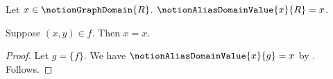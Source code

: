 

\begin{definition}\label{notion_alias_domain_value}
    Let $x\in\notionGraphDomain{R}$.
    $\notionAliasDomainValue{x}{R}=x$.
\end{definition}

\begin{proposition}\label{notion_alias_domain_negative}
    Suppose $(x,y)\in f$.
    Then $x=x$.
\end{proposition}
\begin{proof}
    Let $g=\{f\}$.
    We have $\notionAliasDomainValue{x}{g}=x$
        by .
    Follows.
\end{proof}
